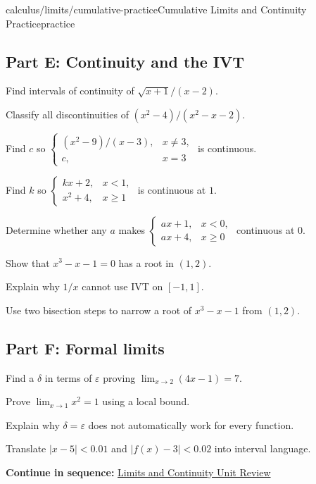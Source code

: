 \documentclass[11pt,openany]{book}
\theoremstyle{bgplain}
\newcommand{\webnext}[2]{%
  \par\addvspace{1.2em}\noindent{\color{BGLine}\rule{\textwidth}{0.35pt}}\par\smallskip
  {\small\color{BGGray}\textbf{Continue in sequence:} \hyperlink{web:#1}{#2}}\par
}
\newcommand{\eps}{\varepsilon}
\begin{document}
\begin{webpage}{calculus/limits/cumulative-practice}{Cumulative Limits and Continuity Practice}{practice}
\subsection*{Part E: Continuity and the IVT}
\begin{bgexercises}[label=\textbf{R\arabic*.},resume]
  \item Find intervals of continuity of \(\sqrt{x+1}/(x-2)\).
  \item Classify all discontinuities of \((x^2-4)/(x^2-x-2)\).
  \item Find \(c\) so \(\begin{cases}(x^2-9)/(x-3),&x\ne3,\\c,&x=3\end{cases}\) is continuous.
  \item Find \(k\) so \(\begin{cases}kx+2,&x<1,\\x^2+4,&x\ge1\end{cases}\) is continuous at \(1\).
  \item Determine whether any \(a\) makes \(\begin{cases}ax+1,&x<0,\\ax+4,&x\ge0\end{cases}\) continuous at \(0\).
  \item Show that \(x^3-x-1=0\) has a root in \((1,2)\).
  \item Explain why \(1/x\) cannot use IVT on \([-1,1]\).
  \item Use two bisection steps to narrow a root of \(x^3-x-1\) from \((1,2)\).
\end{bgexercises}

\subsection*{Part F: Formal limits}
\begin{bgexercises}[label=\textbf{R\arabic*.},resume]
  \item Find a \(\delta\) in terms of \(\eps\) proving \(\lim_{x\to2}(4x-1)=7\).
  \item Prove \(\lim_{x\to1}x^2=1\) using a local bound.
  \item Explain why \(\delta=\eps\) does not automatically work for every function.
  \item Translate \(|x-5|<0.01\) and \(|f(x)-3|<0.02\) into interval language.
\end{bgexercises}
\webnext{calculus/limits/unit-review}{Limits and Continuity Unit Review}
\end{webpage}
\end{document}
